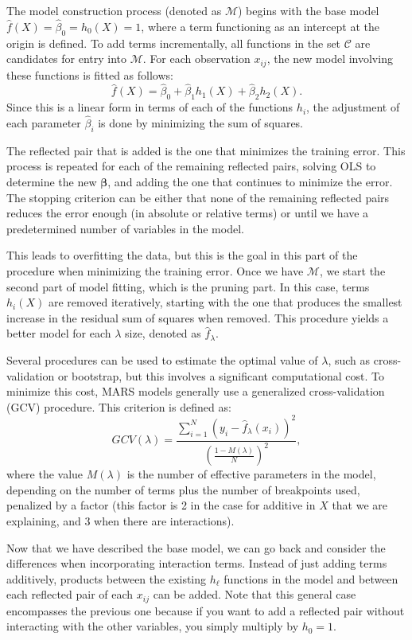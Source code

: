 The model construction process (denoted as $\mathcal{M}$) begins with the base model $\hat f(X) = \hat \beta_0 = h_0(X) = 1$, where a term functioning as an intercept at the origin is defined. To add terms incrementally, all functions in the set $\mathcal{C}$ are candidates for entry into $\mathcal{M}$. For each observation $x_{ij}$, the new model involving these functions is fitted as follows:
$$
\hat f(X) = \hat \beta_0 + \hat \beta_1 h_1(X) + \hat \beta_2 h_2(X).
$$
Since this is a linear form in terms of each of the functions $h_i$, the adjustment of each parameter $\hat \beta_i$ is done by minimizing the sum of squares.

The reflected pair that is added is the one that minimizes the training error. This process is repeated for each of the remaining reflected pairs, solving OLS to determine the new $\boldsymbol\beta$, and adding the one that continues to minimize the error. The stopping criterion can be either that none of the remaining reflected pairs reduces the error enough (in absolute or relative terms) or until we have a predetermined number of variables in the model.

This leads to overfitting the data, but this is the goal in this part of the procedure when minimizing the training error. Once we have $\mathcal{M}$, we start the second part of model fitting, which is the pruning part. In this case, terms $h_i(X)$ are removed iteratively, starting with the one that produces the smallest increase in the residual sum of squares when removed. This procedure yields a better model for each $\lambda$ size, denoted as $\hat f_\lambda$.

Several procedures can be used to estimate the optimal value of $\lambda$, such as cross-validation or bootstrap, but this involves a significant computational cost. To minimize this cost, MARS models generally use a generalized cross-validation (GCV) procedure. This criterion is defined as:
$$
GCV(\lambda) = \frac{ \sum_{i=1}^N (y_i - \hat f_\lambda(x_i))^2 }{\left( \frac{1 - M(\lambda)}{N} \right)^2},
$$
where the value $M(\lambda)$ is the number of effective parameters in the model, depending on the number of terms plus the number of breakpoints used, penalized by a factor (this factor is 2 in the case for additive in $X$ that we are explaining, and 3 when there are interactions).

Now that we have described the base model, we can go back and consider the differences when incorporating interaction terms. Instead of just adding terms additively, products between the existing $h_\ell$ functions in the model and between each reflected pair of each $x_{ij}$ can be added. Note that this general case encompasses the previous one because if you want to add a reflected pair without interacting with the other variables, you simply multiply by $h_0 = 1$.


